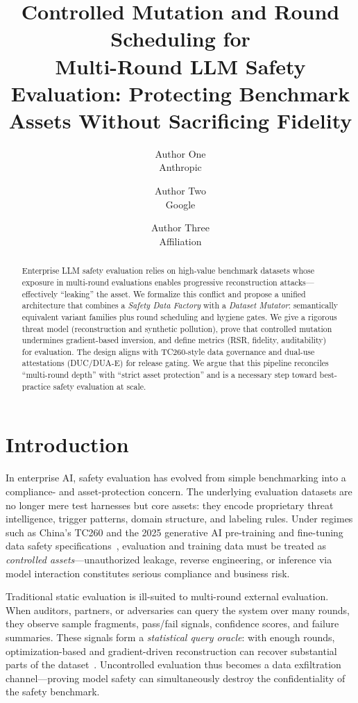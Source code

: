 \documentclass[letterpaper,twocolumn,10pt]{article}
\title{\Large \bf Controlled Mutation and Round Scheduling for\\
  Multi-Round LLM Safety Evaluation: Protecting Benchmark\\
  Assets Without Sacrificing Fidelity}
\author{
{\rm Author One}\\
Anthropic \and
{\rm Author Two}\\
Google \and
{\rm Author Three}\\
Affiliation
}
\date{}
\begin{document}
\maketitle

\begin{abstract}
Enterprise LLM safety evaluation relies on high-value benchmark datasets whose exposure in multi-round evaluations enables progressive reconstruction attacks---effectively ``leaking'' the asset. We formalize this conflict and propose a unified architecture that combines a \emph{Safety Data Factory} with a \emph{Dataset Mutator}: semantically equivalent variant families plus round scheduling and hygiene gates. We give a rigorous threat model (reconstruction and synthetic pollution), prove that controlled mutation undermines gradient-based inversion, and define metrics (RSR, fidelity, auditability) for evaluation. The design aligns with TC260-style data governance and dual-use attestations (DUC/DUA-E) for release gating. We argue that this pipeline reconciles ``multi-round depth'' with ``strict asset protection'' and is a necessary step toward best-practice safety evaluation at scale.
\end{abstract}

\section{Introduction}

In enterprise AI, safety evaluation has evolved from simple benchmarking into a compliance- and asset-protection concern. The underlying evaluation datasets are no longer mere test harnesses but core assets: they encode proprietary threat intelligence, trigger patterns, domain structure, and labeling rules. Under regimes such as China's TC260 and the 2025 generative AI pre-training and fine-tuning data safety specifications~\cite{tc260-training-data,tc260-governance}, evaluation and training data must be treated as \emph{controlled assets}---unauthorized leakage, reverse engineering, or inference via model interaction constitutes serious compliance and business risk.

Traditional static evaluation is ill-suited to multi-round external evaluation. When auditors, partners, or adversaries can query the system over many rounds, they observe sample fragments, pass/fail signals, confidence scores, and failure summaries. These signals form a \emph{statistical query oracle}: with enough rounds, optimization-based and gradient-driven reconstruction can recover substantial parts of the dataset~\cite{llm-reconstruction-emergent,jailbreak-multi-round}. Uncontrolled evaluation thus becomes a data exfiltration channel---proving model safety can simultaneously destroy the confidentiality of the safety benchmark.
\end{document}
